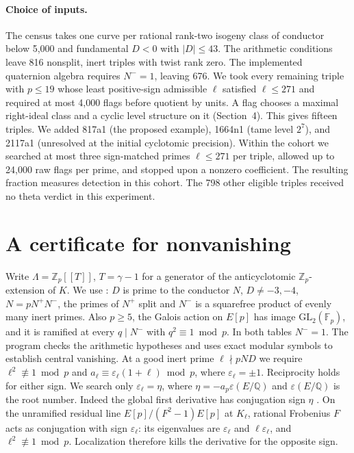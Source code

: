 \documentclass[11pt]{article}
\newcommand{\Q}{\mathbb Q}
\newcommand{\Z}{\mathbb Z}
\newcommand{\F}{\mathbb F}
\begin{document}
\paragraph{Choice of inputs.}
The census takes one curve per rational rank-two isogeny class of conductor below 5,000 and fundamental $D<0$ with $|D|\le43$. The arithmetic conditions leave 816 nonsplit, inert triples with twist rank zero. The implemented quaternion algebra requires $N^-=1$, leaving 676. We took every remaining triple with $p\le19$ whose least positive-sign admissible $\ell$ satisfied $\ell\le271$ and required at most 4,000 flags before quotient by units. A flag chooses a maximal right-ideal class and a cyclic level structure on it (Section~4). This gives fifteen triples. We added 817a1 (the proposed example), 1664n1 (tame level $2^7$), and 2117a1 (unresolved at the initial cyclotomic precision). Within the cohort we searched at most three sign-matched primes $\ell\le271$ per triple, allowed up to 24,000 raw flags per prime, and stopped upon a nonzero coefficient. The resulting fraction measures detection in this cohort. The 798 other eligible triples received no theta verdict in this experiment.

\section{A certificate for nonvanishing}
Write $\Lambda=\Z_p[[T]]$, $T=\gamma-1$ for a generator of the anticyclotomic $\Z_p$-extension of $K$. We use \cite[Assumptions 1.1--1.2]{FG}: $D$ is prime to the conductor $N$, $D\ne-3,-4$, $N=pN^+N^-$, the primes of $N^+$ split and $N^-$ is a squarefree product of evenly many inert primes. Also $p\ge5$, the Galois action on $E[p]$ has image $\mathrm{GL}_2(\F_p)$, and it is ramified at every $q\mid N^-$ with $q^2\equiv1\bmod p$. In both tables $N^-=1$. The program checks the arithmetic hypotheses and uses exact modular symbols to establish central vanishing. At a good inert prime $\ell\nmid pND$ we require $\ell^2\not\equiv1\bmod p$ and $a_\ell\equiv\varepsilon_\ell(1+\ell)\bmod p$, where $\varepsilon_\ell=\pm1$. Reciprocity holds for either sign. We search only $\varepsilon_\ell=\eta$, where $\eta=-a_p\varepsilon(E/\Q)$ and $\varepsilon(E/\Q)$ is the root number. Indeed the global first derivative has conjugation sign $\eta$ \cite[Corollary 2.9 and proof of Theorem 3.4]{FG}. On the unramified residual line $E[p]/(F^2-1)E[p]$ at $K_\ell$, rational Frobenius $F$ acts as conjugation with sign $\varepsilon_\ell$: its eigenvalues are $\varepsilon_\ell$ and $\ell\varepsilon_\ell$, and $\ell^2\not\equiv1\bmod p$. Localization therefore kills the derivative for the opposite sign.
\end{document}
